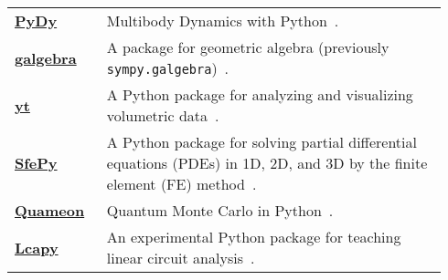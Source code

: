 \begin{longtable}[htbc]{>{\raggedright}p{0.2\linewidth}p{0.74\linewidth}}
\href{http://www.pydy.org/}{\textbf{PyDy}} & Multibody Dynamics with
  Python~\cite{gede2013constrained}. \\

\href{https://github.com/brombo/galgebra}{\textbf{galgebra}} &
  A package for geometric algebra (previously \texttt{sympy.galgebra})~\cite{galgebra}. \\

\href{http://yt-project.org/}{\textbf{yt}} & A Python package for
  analyzing and visualizing volumetric data~\cite{2011ApJS..192....9T}. \\

\href{http://sfepy.org/}{\textbf{SfePy}} &
  A Python package for solving partial
  differential equations (PDEs) in 1D, 2D, and 3D by the finite element (FE)
  method~\cite{Zienkiewicz2013FEM,cimrman2014sfepy}. \\

\href{http://quameon.sourceforge.net/}{\textbf{Quameon}} & Quantum
  Monte Carlo in Python~\cite{quameon}. \\

\href{http://lcapy.elec.canterbury.ac.nz/}{\textbf{Lcapy}} &
  An experimental Python package for teaching linear circuit analysis~\cite{lcapy}. \\
\bottomrule
\end{longtable}
